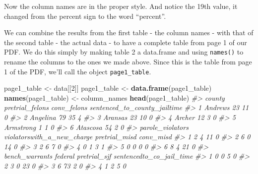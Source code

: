 \documentclass[
  12pt,
]{book}
\newenvironment{Shaded}{\begin{snugshade}}{\end{snugshade}}
\newcommand{\CommentTok}[1]{\textcolor[rgb]{0.37,0.37,0.37}{\textit{#1}}}
\newcommand{\DecValTok}[1]{\textcolor[rgb]{0.06,0.06,0.06}{#1}}
\newcommand{\KeywordTok}[1]{\textcolor[rgb]{0.27,0.27,0.27}{\textbf{#1}}}
\newcommand{\NormalTok}[1]{#1}
\newcommand{\StringTok}[1]{\textcolor[rgb]{0.5,0.5,0.5}{#1}}
\begin{document}
Now the column names are in the proper style. And notice the 19th value, it changed from the percent sign to the word ``percent''.

We can combine the results from the first table - the column names - with that of the second table - the actual data - to have a complete table from page 1 of our PDF. We do this simply by making table 2 a data.frame and using \texttt{names()} to rename the columns to the ones we made above. Since this is the table from page 1 of the PDF, we'll call the object \texttt{page1\_table}.

\begin{Shaded}
\begin{Highlighting}[]
\NormalTok{page1\_table <{-}}\StringTok{ }\NormalTok{data[[}\DecValTok{2}\NormalTok{]]}
\NormalTok{page1\_table <{-}}\StringTok{ }\KeywordTok{data.frame}\NormalTok{(page1\_table)}
\KeywordTok{names}\NormalTok{(page1\_table) <{-}}\StringTok{ }\NormalTok{column\_names}
\KeywordTok{head}\NormalTok{(page1\_table)}
\CommentTok{\#>      county pretrial\_felons conv\_felons sentenced\_to\_county\_jailtime}
\CommentTok{\#> 1   Andrews              23          11                            0}
\CommentTok{\#> 2  Angelina              79          35                            4}
\CommentTok{\#> 3   Aransas              23          10                            0}
\CommentTok{\#> 4    Archer              12           3                            0}
\CommentTok{\#> 5 Armstrong               1           1                            0}
\CommentTok{\#> 6  Atascosa              54           2                            0}
\CommentTok{\#>   parole\_violators violatorswith\_a\_new\_charge pretrial\_misd conv\_misd}
\CommentTok{\#> 1                2                          4            11         0}
\CommentTok{\#> 2                6                          0            14         0}
\CommentTok{\#> 3                2                          6             7         0}
\CommentTok{\#> 4                0                          1             3         1}
\CommentTok{\#> 5                0                          0             0         0}
\CommentTok{\#> 6                8                          4            21         0}
\CommentTok{\#>   bench\_warrants federal pretrial\_sjf sentencedto\_co\_jail\_time}
\CommentTok{\#> 1              0       0            5                        0}
\CommentTok{\#> 2              3       0           23                        0}
\CommentTok{\#> 3              6      73            2                        0}
\CommentTok{\#> 4              1       2            5                        0}

\end{Highlighting}
\end{Shaded}
\end{document}
